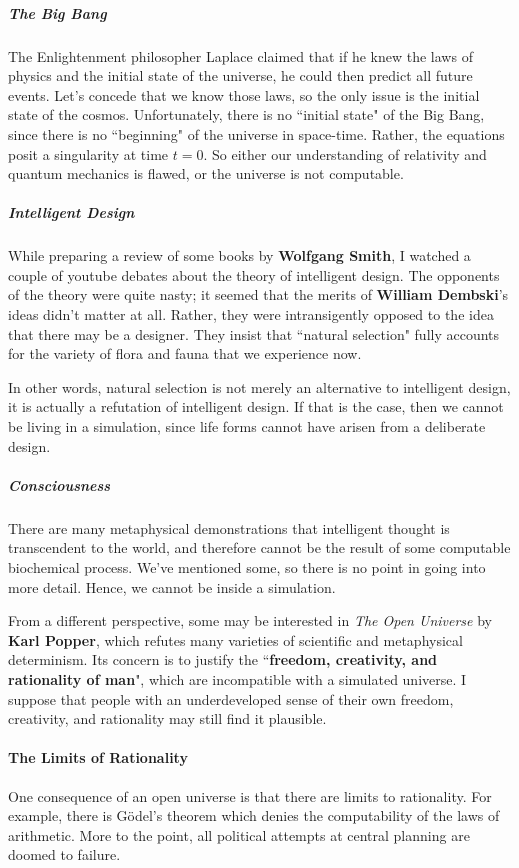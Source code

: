 \subparagraph{The Big Bang}
The Enlightenment philosopher Laplace claimed that if he knew the laws of physics and the initial state of the universe, he could then predict all future events. Let's concede that we know those laws, so the only issue is the initial state of the cosmos. Unfortunately, there is no ``initial state" of the Big Bang, since there is no ``beginning" of the universe in space-time. Rather, the equations posit a singularity at time $t=0$. So either our understanding of relativity and quantum mechanics is flawed, or the universe is not computable.

\subparagraph{Intelligent Design}
While preparing a review of some books by \textbf{Wolfgang Smith}, I watched a couple of youtube debates about the theory of intelligent design. The opponents of the theory were quite nasty; it seemed that the merits of \textbf{William Dembski}'s ideas didn't matter at all. Rather, they were intransigently opposed to the idea that there may be a designer. They insist that ``natural selection" fully accounts for the variety of flora and fauna that we experience now.

In other words, natural selection is not merely an alternative to intelligent design, it is actually a refutation of intelligent design. If that is the case, then we cannot be living in a simulation, since life forms cannot have arisen from a deliberate design.

\subparagraph{Consciousness}
There are many metaphysical demonstrations that intelligent thought is transcendent to the world, and therefore cannot be the result of some computable biochemical process. We've mentioned some, so there is no point in going into more detail. Hence, we cannot be inside a simulation.

From a different perspective, some may be interested in \emph{The Open Universe} by \textbf{Karl Popper}, which refutes many varieties of scientific and metaphysical determinism. Its concern is to justify the ``\textbf{freedom, creativity, and rationality of man}", which are incompatible with a simulated universe. I suppose that people with an underdeveloped sense of their own freedom, creativity, and rationality may still find it plausible.

\paragraph{The Limits of Rationality}
One consequence of an open universe is that there are limits to rationality. For example, there is Gödel's theorem which denies the computability of the laws of arithmetic. More to the point, all political attempts at central planning are doomed to failure.

